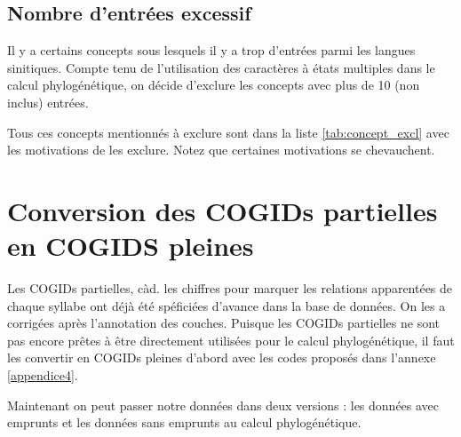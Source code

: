 \documentclass{scrbook}
\newcounter{c}[subsubsection]
\begin{document}
\begin{sloppypar}
\subsection{Nombre d'entrées excessif}
Il y a certains concepts sous lesquels il y a trop d'entrées parmi les langues sinitiques. Compte tenu de l'utilisation des caractères à états multiples dans le calcul phylogénétique, on décide d'exclure les concepts avec plus de 10 (non inclus) entrées. 

Tous ces concepts mentionnés à exclure sont dans la liste \ref{tab:concept_excl} avec les motivations de les exclure. Notez que certaines motivations se chevauchent.

\section{Conversion des COGIDs partielles en COGIDS pleines}\label{convers_COGID}
Les COGIDs partielles, càd. les chiffres pour marquer les relations apparentées de chaque syllabe ont déjà été spéficiées d'avance dans la base de données. On les a corrigées après l'annotation des couches. Puisque les COGIDs partielles ne sont pas encore prêtes à être directement utilisées pour le calcul phylogénétique, il faut les convertir en COGIDs pleines d'abord avec les codes proposés dans l'annexe \ref{appendice4}.

Maintenant on peut passer notre données dans deux versions : les données avec emprunts et les données sans emprunts au calcul phylogénétique.


\end{sloppypar}
\end{document}
